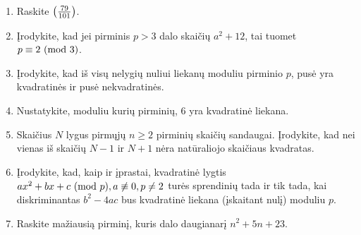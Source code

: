 \begin{enumerate} 
  \item Raskite $\left(\frac{79}{101}\right)$.  
  \item Įrodykite, kad jei pirminis $p > 3$ dalo skaičių $a^2 + 12$, tai tuomet
    $p \equiv 2 \ (\text{mod } 3)$.  
  \item Įrodykite, kad iš visų nelygių nuliui liekanų moduliu pirminio $p$, pusė
    yra kvadratinės ir pusė nekvadratinės. 
  \item Nustatykite, moduliu kurių pirminių, $6$ yra kvadratinė liekana. 
  \item \text{[LitMo 1987]}Skaičius $N$ lygus pirmųjų $n\geq 2$ pirminių
    skaičių sandaugai. Įrodykite, kad nei vienas iš skaičių $N-1$ ir
    $N+1$ nėra natūraliojo skaičiaus kvadratas.
  \item Įrodykite, kad, kaip ir įprastai, kvadratinė lygtis
    $ax^2+bx+c\ (\text{mod } p), a\not \equiv 0, p\neq 2$ turės sprendinių tada ir tik tada, kai
    diskriminantas $b^2-4ac$ bus kvadratinė liekana (įskaitant nulį) moduliu $p$.
  \item \text{[Brazil 2003]} Raskite mažiausią pirminį, kuris dalo
    daugianarį $n^2 + 5n +23$.

\end{enumerate}
